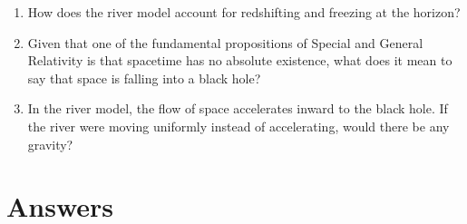 \documentclass[twocolumn,showpacs,preprintnumbers,amsmath,amssymb,prb]{revtex4}
\begin{document}
\begin{enumerate}
\item[$^\ast$7.]
How does the river model account for redshifting and freezing at the horizon?

\item[$^\ast$8.]
Given that one of the fundamental propositions of Special and General
Relativity is that spacetime has no absolute existence, what does it
mean to say that space is falling into a black hole?

\item[$^\ast$9.]
In the river model, the flow of space accelerates inward to the black hole.
If the river were moving uniformly instead of accelerating,
would there be any gravity?

\end{enumerate}

%

\section*{Answers}
\end{document}
